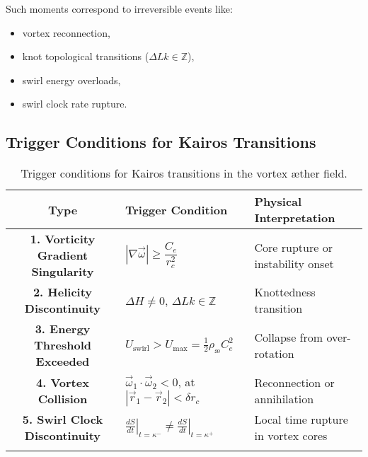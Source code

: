 \documentclass[12pt]{article}
\begin{document}
    Such moments correspond to irreversible events like:
    \begin{itemize}
        \item vortex reconnection,
        \item knot topological transitions (\( \Delta Lk \in \mathbb{Z} \)),
        \item swirl energy overloads,
        \item swirl clock rate rupture.
    \end{itemize}

    \subsection{Trigger Conditions for Kairos Transitions}
\begin{eqbox}
    \begin{table}[H]
        \centering
        \footnotesize
        \renewcommand{\arraystretch}{1.4}
        \begin{tabular}{|c|l|l|}
            \hline
            \textbf{Type} & \textbf{Trigger Condition} & \textbf{Physical Interpretation} \\
            \hline
            \textbf{1. Vorticity Gradient Singularity} &
            $|\nabla \vec{\omega}| \geq \dfrac{C_e}{r_c^2}$ &
            Core rupture or instability onset \\
            \textbf{2. Helicity Discontinuity} &
            $\Delta H \neq 0$, $\Delta Lk \in \mathbb{Z}$ &
            Knottedness transition \\
            \textbf{3. Energy Threshold Exceeded} &
            $U_{\text{swirl}} > U_{\text{max}} = \frac{1}{2} \rho_{\text{\ae}} C_e^2$ &
            Collapse from over-rotation \\
            \textbf{4. Vortex Collision} &
            $\vec{\omega}_1 \cdot \vec{\omega}_2 < 0$, at $|\vec{r}_1 - \vec{r}_2| < \delta r_c$ &
            Reconnection or annihilation \\
            \textbf{5. Swirl Clock Discontinuity} &
            $\left.\frac{dS}{dt}\right|_{t = \kappa^-} \neq \left.\frac{dS}{dt}\right|_{t = \kappa^+}$ &
            Local time rupture in vortex cores \\
            & & \\
            \hline
        \end{tabular}
        \caption{Trigger conditions for Kairos transitions in the vortex æther field.}\label{tab:table}
    \end{table}
\end{eqbox}
\end{document}
